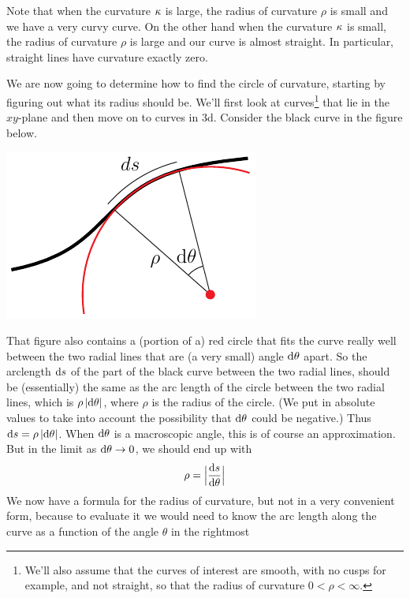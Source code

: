 Note that when the curvature $\kappa$ is large, the radius of curvature $\rho$
is small and we have a very curvy curve. On the other hand when the 
curvature $\kappa$ is small, the radius of curvature $\rho$ is large and 
our curve  is almost straight. In particular, straight lines have 
curvature exactly zero.

We are now going to determine how to find the circle of curvature,
starting by figuring out what its radius should be. We'll first look 
at curves\footnote{We'll also assume that the curves of interest are smooth,
with no cusps for example, and not straight, so that the radius of 
curvature $0<\rho<\infty$.} 
that lie in the $xy$-plane and then move on to curves in 3d. 
Consider the black curve in the figure below. 
\begin{efig}
\begin{center}
     \includegraphics{curvature.pdf}
\end{center}
\end{efig}
That figure also contains a (portion of a) red circle that fits the 
curve really well between the two radial lines that are (a very small) angle
$\mathrm{d}\theta$ apart. So the arclength $\mathrm{d}s$ of the part of the black 
curve between the two radial lines, should be (essentially) the same 
as the arc length of the circle between the two radial lines, which is 
$\rho\,|\mathrm{d}\theta|$, where $\rho$ is the radius of the circle. 
(We put in absolute values to take into account the
possibility that $\mathrm{d}\theta$ could be negative.)
Thus $\mathrm{d}s = \rho\,|\mathrm{d}\theta|$. When $\mathrm{d}\theta$ is a macroscopic
angle, this is of course an approximation. But in the limit as 
$\mathrm{d}\theta\rightarrow 0$, we should end up with
\begin{equation*}
\rho = \Big|\diff{s}{\theta}\Big|
\end{equation*} 
We now have a formula for the radius of curvature, but not in a very 
convenient form, because to evaluate it we would need to know the arc length
along the curve as a function of the angle $\theta$ in the rightmost 
